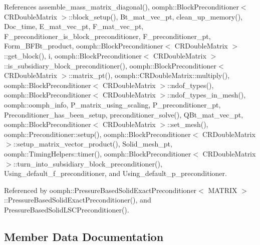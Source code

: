 References assemble\+\_\+mass\+\_\+matrix\+\_\+diagonal(), oomph\+::\+Block\+Preconditioner$<$ C\+R\+Double\+Matrix $>$\+::block\+\_\+setup(), Bt\+\_\+mat\+\_\+vec\+\_\+pt, clean\+\_\+up\+\_\+memory(), Doc\+\_\+time, E\+\_\+mat\+\_\+vec\+\_\+pt, F\+\_\+mat\+\_\+vec\+\_\+pt, F\+\_\+preconditioner\+\_\+is\+\_\+block\+\_\+preconditioner, F\+\_\+preconditioner\+\_\+pt, Form\+\_\+\+B\+F\+Bt\+\_\+product, oomph\+::\+Block\+Preconditioner$<$ C\+R\+Double\+Matrix $>$\+::get\+\_\+block(), i, oomph\+::\+Block\+Preconditioner$<$ C\+R\+Double\+Matrix $>$\+::is\+\_\+subsidiary\+\_\+block\+\_\+preconditioner(), oomph\+::\+Block\+Preconditioner$<$ C\+R\+Double\+Matrix $>$\+::matrix\+\_\+pt(), oomph\+::\+C\+R\+Double\+Matrix\+::multiply(), oomph\+::\+Block\+Preconditioner$<$ C\+R\+Double\+Matrix $>$\+::ndof\+\_\+types(), oomph\+::\+Block\+Preconditioner$<$ C\+R\+Double\+Matrix $>$\+::ndof\+\_\+types\+\_\+in\+\_\+mesh(), oomph\+::oomph\+\_\+info, P\+\_\+matrix\+\_\+using\+\_\+scaling, P\+\_\+preconditioner\+\_\+pt, Preconditioner\+\_\+has\+\_\+been\+\_\+setup, preconditioner\+\_\+solve(), Q\+Bt\+\_\+mat\+\_\+vec\+\_\+pt, oomph\+::\+Block\+Preconditioner$<$ C\+R\+Double\+Matrix $>$\+::set\+\_\+mesh(), oomph\+::\+Preconditioner\+::setup(), oomph\+::\+Block\+Preconditioner$<$ C\+R\+Double\+Matrix $>$\+::setup\+\_\+matrix\+\_\+vector\+\_\+product(), Solid\+\_\+mesh\+\_\+pt, oomph\+::\+Timing\+Helpers\+::timer(), oomph\+::\+Block\+Preconditioner$<$ C\+R\+Double\+Matrix $>$\+::turn\+\_\+into\+\_\+subsidiary\+\_\+block\+\_\+preconditioner(), Using\+\_\+default\+\_\+f\+\_\+preconditioner, and Using\+\_\+default\+\_\+p\+\_\+preconditioner.



Referenced by oomph\+::\+Pressure\+Based\+Solid\+Exact\+Preconditioner$<$ M\+A\+T\+R\+I\+X $>$\+::\+Pressure\+Based\+Solid\+Exact\+Preconditioner(), and Pressure\+Based\+Solid\+L\+S\+C\+Preconditioner().



\subsection{Member Data Documentation}
\mbox{\label{classoomph_1_1PressureBasedSolidLSCPreconditioner_ac71c3f992d9790ca2e25e9c360eed635}} 
